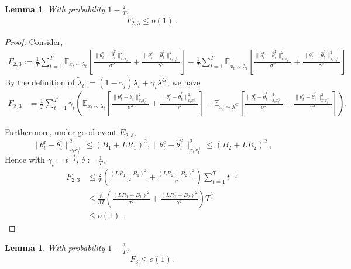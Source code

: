 \documentclass[accepted]{uai2025} %
\theoremstyle{plain}
\newtheorem{lemma}[theorem]{Lemma}
\theoremstyle{definition}
\theoremstyle{remark}
\newcommand{\hthetact}{\hat{\theta}_t^{\mathrm{c}}}
\newcommand{\hthetart}{\hat{\theta}_t^{\mathrm{r}}}
\begin{document}
\begin{lemma}
\label{lem:Regret_F23}
With probability $1-\frac{2}{T}$,
    \begin{align*}
        F_{2,3}\le o(1)~.
    \end{align*}
\end{lemma}

\begin{proof}
Consider,
    \begin{align*}
        F_{2,3}:=\frac{1}{T} 
\sum_{t=1}^{T} \mathbb{E}_{ x_t\sim \lambda_t} 
\left[ \frac{\|\theta_t^\mathrm{r} - \hthetart\|_{x_t x_t^\top}^2}{\sigma^2} 
+ \frac{\|\theta_t^\mathrm{c} - \hthetact\|_{x_t x_t^\top}^2}{\gamma^2} \right]
-
\frac{1}{T} \sum_{t=1}^{T} \mathbb{E}_{ x_t\sim \tilde{\lambda}_t} 
\left[ \frac{\|\theta_t^\mathrm{r} - \hthetart\|_{x_t x_t^\top}^2}{\sigma^2} 
+ \frac{\|\theta_t^\mathrm{c} - \hthetact\|_{x_t x_t^\top}^2}{\gamma^2} \right]
    \end{align*}
By the definition of $\tilde{\lambda}_t:=(1-\gamma_t)\lambda_t+\gamma_t\lambda^{G}$, we have
\begin{align*}
    F_{2,3}&=\frac{1}{T} \sum_{t=1}^T \gamma_t\left( \mathbb{E}_{ x_t\sim \lambda_t} 
\left[ \frac{\|\theta_t^\mathrm{r} - \hthetart\|_{x_t x_t^\top}^2}{\sigma^2} 
+ \frac{\|\theta_t^\mathrm{c} - \hthetact\|_{x_t x_t^\top}^2}{\gamma^2}  \right]-\mathbb{E}_{ x_t\sim \lambda^G} 
\left[ \frac{\|\theta_t^\mathrm{r} - \hthetart\|_{x_t x_t^\top}^2}{\sigma^2} 
+ \frac{\|\theta_t^\mathrm{c} - \hthetact\|_{x_t x_t^\top}^2}{\gamma^2} \right]\right).
\end{align*}

Furthermore, under good event $E_{2,\delta}$, 
$$\|\theta_t^\mathrm{r} - \hthetart\|_{x_t x_t^\top}^2\le (B_1+LR_1)^2, \|\theta_t^\mathrm{c} - \hthetact\|_{x_t x_t^\top}^2\le (B_2+LR_2)^2~,$$
Hence with $\gamma_t= t^{-\frac{1}{4}}$, $\delta:=\frac{1}{T}$,
\begin{align*}
    F_{2,3}&\le \frac{2}{T} \left(\frac{(LR_1+B_1)^2}{\sigma^2}+\frac{(LR_2+B_2)^2}{\gamma^2}\right)\sum_{t=1}^T t^{-\frac{1}{4}}
    \\&\le \frac{8}{3T} \left(\frac{(LR_1+B_1)^2}{\sigma^2}+\frac{(LR_2+B_2)^2}{\gamma^2}\right) T^{\frac{3}{4}}
    \\&\le o(1)~.
\end{align*}
\end{proof}


\begin{lemma}
With probability $1 - \frac{3}{T}$,
\label{lem:Regret_F3}
\begin{align*}
    F_3 \le o(1).
\end{align*}
\end{lemma}
\end{document}
